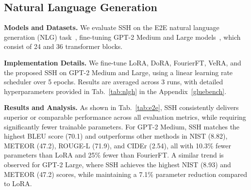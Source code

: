 \subsection{Natural Language Generation}


\noindent \textbf{Models and Datasets.}  
We evaluate SSH on the E2E natural language generation (NLG) task~\cite{novikova2017e2e}, fine-tuning GPT-2 Medium and Large models~\cite{radford2019language}, which consist of 24 and 36 transformer blocks.

\noindent \textbf{Implementation Details.}  
We fine-tune LoRA, DoRA, FourierFT, VeRA, and the proposed SSH on GPT-2 Medium and Large, using a linear learning rate scheduler over 5 epochs. Results are averaged across 3 runs, with detailed hyperparameters provided in Tab.~\ref{tab:nlgh} in the Appendix~\ref{gluebench}.




\noindent \textbf{Results and Analysis.}  
As shown in Tab.~\ref{tab:e2e}, SSH consistently delivers superior or comparable performance across all evaluation metrics, while requiring significantly fewer trainable parameters. For GPT-2 Medium, SSH matches the highest BLEU score (70.1) and outperforms other methods in NIST (8.82), METEOR (47.2), ROUGE-L (71.9), and CIDEr (2.54), all with 10.3\% fewer parameters than LoRA and 25\% fewer than FourierFT. A similar trend is observed for GPT-2 Large, where SSH achieves the highest NIST (8.93) and METEOR (47.2) scores, while maintaining a 7.1\% parameter reduction compared to LoRA. 




